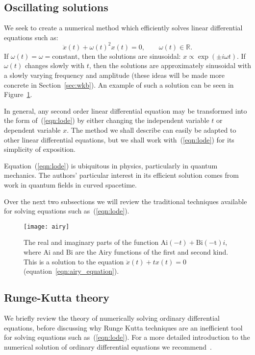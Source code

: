 \subsection{Oscillating solutions}
We seek to create a numerical method which efficiently solves linear differential equations such as:
\begin{equation}
  \ddot{x}(t) + {\omega(t)}^2x(t) = 0,\qquad \omega(t)\in\mathbb{R}.
  \label{eqn:lode}
\end{equation}
If $\omega(t)=\omega = \mathrm{constant}$, then the solutions are sinusoidal: $x\propto \exp{(\pm i \omega t)}$. If $\omega(t)$ changes slowly with $t$, then the solutions are approximately sinusoidal with a slowly varying frequency and amplitude (these ideas will be made more concrete in Section~\ref{sec:wkb}). An example of such a solution can be seen in Figure~\ref{fig:airy}.

In general, any second order linear differential equation may be transformed into the form of~(\ref{eqn:lode}) by either changing the independent variable $t$ or dependent variable $x$. The method we shall describe can easily be adapted to other linear differential equations, but we shall work with~(\ref{eqn:lode}) for its simplicity of exposition.

Equation~(\ref{eqn:lode}) is ubiquitous in physics, particularly in quantum mechanics. The authors' particular interest in its efficient solution comes from work in quantum fields in curved spacetime.



Over the next two subsections we will review the traditional techniques available for solving equations such as~(\ref{eqn:lode}).

\begin{figure}[]
  \centering
  \texttt{[image: airy]}
  \caption{The real and imaginary parts of the function $\mathrm{Ai}(-t) + \mathrm{Bi(-t)} i$, where $\mathrm{Ai}$ and $\mathrm{Bi}$ are the Airy functions of the first and second kind. This is a solution to the equation ${\ddot{x}(t) + t x(t) = 0}$ (equation~\ref{eqn:airy_equation}).\label{fig:airy}}
\end{figure}


\subsection{Runge-Kutta theory}
\label{sec:rk}
We briefly review the theory of numerically solving ordinary differential equations, before discussing why Runge Kutta techniques are an inefficient tool for solving equations such as~(\ref{eqn:lode}).
For a more detailed introduction to the numerical solution of ordinary differential equations we recommend~\cite{Press+2007}.

